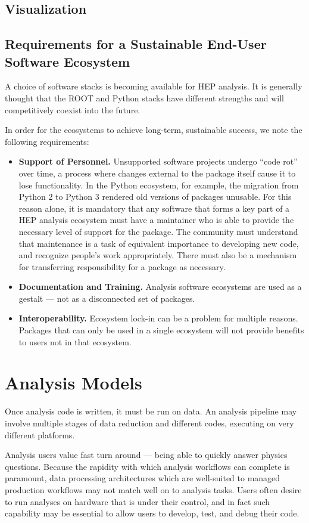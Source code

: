 \subsection{Visualization}

\subsection{Requirements for a Sustainable End-User Software Ecosystem}
A choice of software stacks is becoming available for HEP analysis. It is generally thought that the ROOT and Python stacks have different strengths and will competitively coexist into the future.

In order for the ecosystems to achieve long-term, sustainable success, we note the following requirements:
\begin{itemize}
    \item \textbf{Support of Personnel.} Unsupported software projects undergo ``code rot'' over time, a process where changes external to the package itself cause it to lose functionality. In the Python ecosystem, for example, the migration from Python 2 to Python 3 rendered old versions of packages unusable. For this reason alone, it is mandatory that any software that forms a key part of a HEP analysis ecosystem must have a maintainer who is able to provide the necessary level of support for the package. The community must understand that maintenance is a task of equivalent importance to developing new code, and recognize people's work appropriately. There must also be a mechanism for transferring responsibility for a package as necessary.
    \item \textbf{Documentation and Training.} Analysis software ecosystems are used as a gestalt --- not as a disconnected set of packages. 
    \item \textbf{Interoperability.} Ecosystem lock-in can be a problem for multiple reasons. Packages that can only be used in a single ecosystem will not provide benefits to users not in that ecosystem. 
\end{itemize}

\section{Analysis Models}
Once analysis code is written, it must be run on data. An analysis pipeline may involve multiple stages of data reduction and different codes, executing on very different platforms.

Analysis users value fast turn around --- being able to quickly answer physics questions. Because the rapidity with which analysis workflows can complete is paramount, data processing architectures which are well-suited to managed production workflows may not match well on to analysis tasks. Users often desire to run analyses on hardware that is under their control, and in fact such capability may be essential to allow users to develop, test, and debug their code. 


